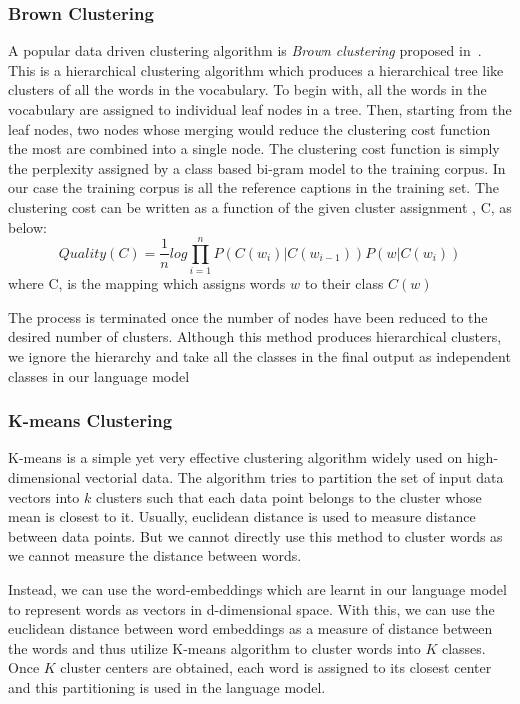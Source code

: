 \subsubsection*{Brown Clustering}
A popular data driven clustering algorithm is \emph{Brown clustering} proposed
in~\cite{BrownClust}.
This is a hierarchical clustering algorithm which produces a hierarchical tree
like clusters of all the words in the vocabulary.
To begin with, all the words in the vocabulary are assigned to individual leaf
nodes in a tree. 
Then, starting from the leaf nodes, two nodes whose merging would reduce the
clustering cost function the most are combined into a single node.
The clustering cost function is simply the perplexity assigned by a class based
bi-gram model to the training corpus. 
In our case the training corpus is all the reference captions in the training
set.
The clustering cost can be written as a function of the given cluster assignment 
, C, as below: 
\begin{equation}
  \label{eq:brown} 
        Quality(C) = \frac{1}{n} log \prod_{i=1}^{n} P(C(w_i)|C(w_{i-1})) P(w|C(w_i))
\end{equation}
\noindent where C, is the mapping which assigns words $w$ to their class $C(w)$

The process is terminated once the number of nodes have been reduced to the
desired number of clusters.
Although this method produces hierarchical clusters, we ignore the hierarchy
and take all the classes in the final output as independent classes
in our language model 
\subsubsection*{K-means Clustering}

K-means is a simple yet very effective clustering algorithm widely used on
high-dimensional vectorial data.
The algorithm tries to partition the set of input data vectors into $k$ clusters
such that each data point belongs to the cluster whose mean is closest to
it.
Usually, euclidean distance is used to measure distance between data points.
But we cannot directly use this method to cluster words as we cannot measure the
distance between words.

Instead, we can use the word-embeddings which are learnt in our language model
to represent words as vectors in d-dimensional space.
With this, we can use the euclidean distance between word embeddings as a
measure of distance between the words and thus utilize K-means algorithm to
cluster words into $K$ classes.
Once $K$ cluster centers are obtained, each word is assigned to its closest center
and this partitioning is used in the language model.

